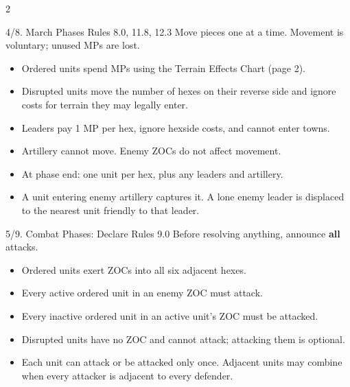 \begin{multicols}{2}
\begin{aidbox}{4/8. March Phases \hfill \normalfont\small Rules 8.0, 11.8, 12.3}
Move pieces one at a time. Movement is voluntary; unused MPs are lost.
\begin{itemize}
  \item Ordered units spend MPs using the Terrain Effects Chart (page 2).
  \item Disrupted units move the number of hexes on their reverse side and ignore costs for terrain they may legally enter.
  \item Leaders pay 1 MP per hex, ignore hexside costs, and cannot enter towns.
  \item Artillery cannot move. Enemy ZOCs do not affect movement.
  \item At phase end: one unit per hex, plus any leaders and artillery.
  \item A unit entering enemy artillery captures it. A lone enemy leader is displaced to the nearest unit friendly to that leader.
\end{itemize}
\end{aidbox}

\columnbreak

\begin{aidbox}{5/9. Combat Phases: Declare \hfill \normalfont\small Rules 9.0}
Before resolving anything, announce \textbf{all} attacks.
\begin{itemize}
  \item Ordered units exert ZOCs into all six adjacent hexes.
  \item Every active ordered unit in an enemy ZOC must attack.
  \item Every inactive ordered unit in an active unit's ZOC must be attacked.
  \item Disrupted units have no ZOC and cannot attack; attacking them is optional.
  \item Each unit can attack or be attacked only once. Adjacent units may combine when every attacker is adjacent to every defender.
\end{itemize}
\end{aidbox}


\end{multicols}
